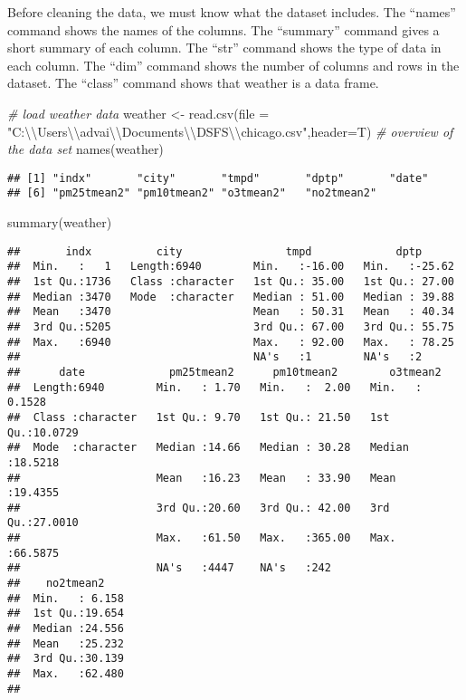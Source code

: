 \documentclass[
]{article}
\newenvironment{Shaded}{\begin{snugshade}}{\end{snugshade}}
\newcommand{\AttributeTok}[1]{\textcolor[rgb]{0.77,0.63,0.00}{#1}}
\newcommand{\CommentTok}[1]{\textcolor[rgb]{0.56,0.35,0.01}{\textit{#1}}}
\newcommand{\FunctionTok}[1]{\textcolor[rgb]{0.00,0.00,0.00}{#1}}
\newcommand{\NormalTok}[1]{#1}
\newcommand{\OtherTok}[1]{\textcolor[rgb]{0.56,0.35,0.01}{#1}}
\newcommand{\SpecialCharTok}[1]{\textcolor[rgb]{0.00,0.00,0.00}{#1}}
\newcommand{\StringTok}[1]{\textcolor[rgb]{0.31,0.60,0.02}{#1}}
\begin{document}
Before cleaning the data, we must know what the dataset includes. The
``names'' command shows the names of the columns. The ``summary''
command gives a short summary of each column. The ``str'' command shows
the type of data in each column. The ``dim'' command shows the number of
columns and rows in the dataset. The ``class'' command shows that
weather is a data frame.

\begin{Shaded}
\begin{Highlighting}[]
\CommentTok{\# load weather data}
\NormalTok{weather }\OtherTok{\textless{}{-}} \FunctionTok{read.csv}\NormalTok{(}\AttributeTok{file =} \StringTok{"C:}\SpecialCharTok{\textbackslash{}\textbackslash{}}\StringTok{Users}\SpecialCharTok{\textbackslash{}\textbackslash{}}\StringTok{advai}\SpecialCharTok{\textbackslash{}\textbackslash{}}\StringTok{Documents}\SpecialCharTok{\textbackslash{}\textbackslash{}}\StringTok{DSFS}\SpecialCharTok{\textbackslash{}\textbackslash{}}\StringTok{chicago.csv"}\NormalTok{,}\AttributeTok{header=}\NormalTok{T)}
\CommentTok{\# overview of the data set}
\FunctionTok{names}\NormalTok{(weather)}
\end{Highlighting}
\end{Shaded}

\begin{verbatim}
## [1] "indx"       "city"       "tmpd"       "dptp"       "date"      
## [6] "pm25tmean2" "pm10tmean2" "o3tmean2"   "no2tmean2"
\end{verbatim}

\begin{Shaded}
\begin{Highlighting}[]
\FunctionTok{summary}\NormalTok{(weather)}
\end{Highlighting}
\end{Shaded}

\begin{verbatim}
##       indx          city                tmpd             dptp       
##  Min.   :   1   Length:6940        Min.   :-16.00   Min.   :-25.62  
##  1st Qu.:1736   Class :character   1st Qu.: 35.00   1st Qu.: 27.00  
##  Median :3470   Mode  :character   Median : 51.00   Median : 39.88  
##  Mean   :3470                      Mean   : 50.31   Mean   : 40.34  
##  3rd Qu.:5205                      3rd Qu.: 67.00   3rd Qu.: 55.75  
##  Max.   :6940                      Max.   : 92.00   Max.   : 78.25  
##                                    NA's   :1        NA's   :2       
##      date             pm25tmean2      pm10tmean2        o3tmean2      
##  Length:6940        Min.   : 1.70   Min.   :  2.00   Min.   : 0.1528  
##  Class :character   1st Qu.: 9.70   1st Qu.: 21.50   1st Qu.:10.0729  
##  Mode  :character   Median :14.66   Median : 30.28   Median :18.5218  
##                     Mean   :16.23   Mean   : 33.90   Mean   :19.4355  
##                     3rd Qu.:20.60   3rd Qu.: 42.00   3rd Qu.:27.0010  
##                     Max.   :61.50   Max.   :365.00   Max.   :66.5875  
##                     NA's   :4447    NA's   :242                       
##    no2tmean2     
##  Min.   : 6.158  
##  1st Qu.:19.654  
##  Median :24.556  
##  Mean   :25.232  
##  3rd Qu.:30.139  
##  Max.   :62.480  
## 
\end{verbatim}
\end{document}

